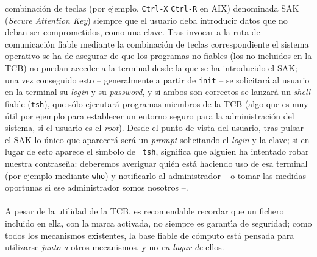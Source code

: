 combinaci\'on de teclas (por ejemplo, {\tt Ctrl-X} {\tt Ctrl-R} en AIX) 
denominada SAK ({\it Secure Attention Key}) siempre que el usuario deba 
introducir datos que no deban ser comprometidos, como una clave. Tras invocar 
a la ruta de comunicaci\'on fiable mediante la combinaci\'on de teclas 
correspondiente el sistema operativo se ha de asegurar de que los programas no
fiables (los no incluidos en la TCB) no puedan acceder a la terminal desde la
que se ha introducido el SAK; una vez conseguido esto -- generalmente a partir
de {\tt init} -- se solicitar\'a al usuario en la terminal su {\it login} y 
su {\it password}, y si ambos son correctos se lanzar\'a un {\it shell} fiable
({\tt tsh}), que s\'olo ejecutar\'a programas miembros de la TCB (algo que 
es muy \'util por ejemplo para establecer un entorno seguro para la 
administraci\'on del
sistema, si el usuario es el {\it root}). Desde el punto de vista del usuario,
tras pulsar el SAK lo \'unico que aparecer\'a ser\'a un {\it prompt} solicitando
el {\it login} y la clave; si en lugar de esto aparece el s\'{\i}mbolo de {\tt
tsh}, significa que alguien ha intentado robar nuestra contrase\~na: deberemos
averiguar qui\'en est\'a haciendo uso de esa terminal (por ejemplo mediante
{\tt who}) y notificarlo al administrador -- o tomar las medidas oportunas si
ese administrador somos nosotros --.\\
\\A pesar de la utilidad de la TCB, es recomendable recordar que un fichero 
incluido en ella, con la marca activada, no siempre es garant\'{\i}a de 
seguridad; como todos los mecanismos existentes, la base fiable de c\'omputo 
est\'a pensada para utilizarse {\it junto a} otros mecanismos, y no {\it en 
lugar de} ellos.
